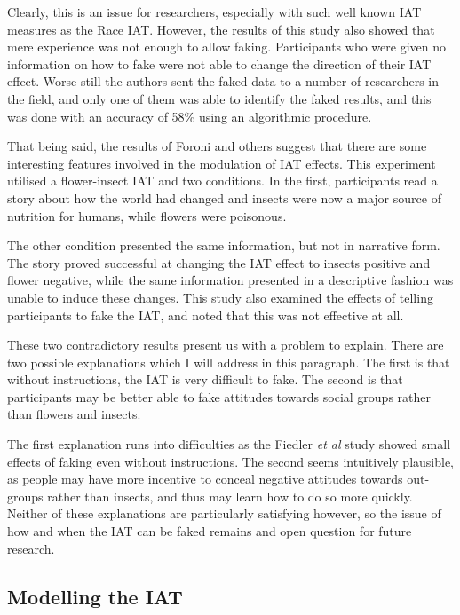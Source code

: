 Clearly, this is an issue for researchers, especially with such well known IAT measures as the Race IAT. However, the results of this study also showed that mere experience was not enough to allow faking. Participants who were given no information on how to fake were not able to change the direction of their IAT effect. Worse still the authors sent the faked data to a number of researchers in the field, and only one of them was able to identify the faked results, and this was done with an accuracy of 58\% using an algorithmic procedure.   

That being said, the results of Foroni and others \cite{Foroni2005}  suggest that there are some interesting features involved in the modulation of IAT effects. This experiment utilised a flower-insect IAT \cite{Greenwald1998} and two conditions. In the first, participants read a story about how the world had changed and insects were now a major source of nutrition for humans, while flowers were poisonous. 

The other condition presented the same information, but not in narrative form. The story proved successful at changing the IAT effect to insects positive and flower negative, while the same information presented in a descriptive fashion was unable to induce these changes. This study also examined the effects of telling participants to fake the IAT, and noted that this was not effective at all. 

These two contradictory results present us with a problem to explain. There are two possible explanations which I will address in this paragraph. The first is that without instructions, the IAT is very difficult to fake. The second is that participants may be better able to fake attitudes towards social groups rather than flowers and insects. 

The first explanation runs into difficulties as the Fiedler \textit{et al}  study showed small effects of faking even without instructions. The second seems intuitively plausible, as people may have more incentive to conceal negative attitudes towards out-groups rather than insects, and thus may learn how to do so more quickly. Neither of these explanations are particularly satisfying however, so the issue of how and when the IAT can be faked remains and open question for future research. 

 \subsection{Modelling the IAT}
 \label{sec:modelling-iat}

